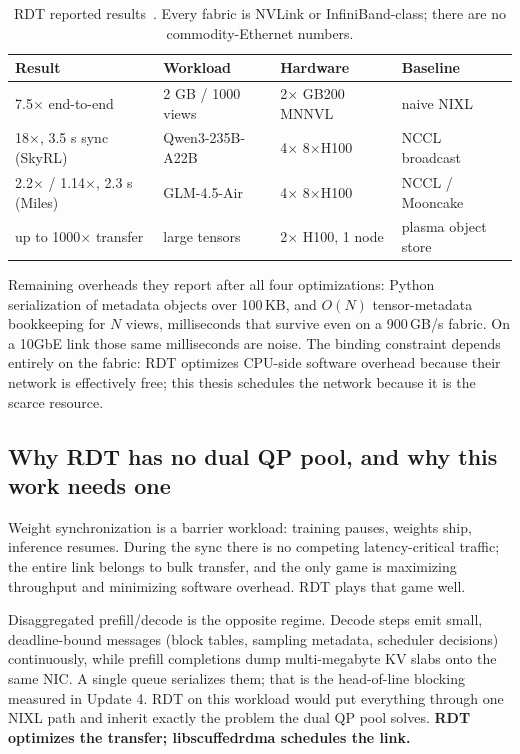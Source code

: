 \documentclass[11pt,letterpaper]{article}
\begin{document}
\begin{table}[ht]
\centering\small
\begin{tabular}{llll}
\toprule
\textbf{Result} & \textbf{Workload} & \textbf{Hardware} & \textbf{Baseline} \\
\midrule
7.5$\times$ end-to-end & 2 GB / 1000 views & 2$\times$ GB200 MNNVL & naive NIXL \\
18$\times$, 3.5 s sync (SkyRL) & Qwen3-235B-A22B & 4$\times$ 8$\times$H100 & NCCL broadcast \\
2.2$\times$ / 1.14$\times$, 2.3 s (Miles) & GLM-4.5-Air & 4$\times$ 8$\times$H100 & NCCL / Mooncake \\
up to 1000$\times$ transfer & large tensors & 2$\times$ H100, 1 node & plasma object store \\
\bottomrule
\end{tabular}
\caption{RDT reported results~\cite{anyscale_rdt2,anyscale_rdt1}. Every fabric is NVLink or InfiniBand-class; there are no commodity-Ethernet numbers.}
\label{tab:rdt_results}
\end{table}

Remaining overheads they report after all four optimizations: Python serialization of metadata objects over 100\,KB, and $O(N)$ tensor-metadata bookkeeping for $N$ views, milliseconds that survive even on a 900\,GB/s fabric. On a 10GbE link those same milliseconds are noise. The binding constraint depends entirely on the fabric: RDT optimizes CPU-side software overhead because their network is effectively free; this thesis schedules the network because it is the scarce resource.

\subsection{Why RDT has no dual QP pool, and why this work needs one}

Weight synchronization is a barrier workload: training pauses, weights ship, inference resumes. During the sync there is no competing latency-critical traffic; the entire link belongs to bulk transfer, and the only game is maximizing throughput and minimizing software overhead. RDT plays that game well.

Disaggregated prefill/decode is the opposite regime. Decode steps emit small, deadline-bound messages (block tables, sampling metadata, scheduler decisions) continuously, while prefill completions dump multi-megabyte KV slabs onto the same NIC. A single queue serializes them; that is the head-of-line blocking measured in Update 4. RDT on this workload would put everything through one NIXL path and inherit exactly the problem the dual QP pool solves. \textbf{RDT optimizes the transfer; libscuffedrdma schedules the link.}
\end{document}

